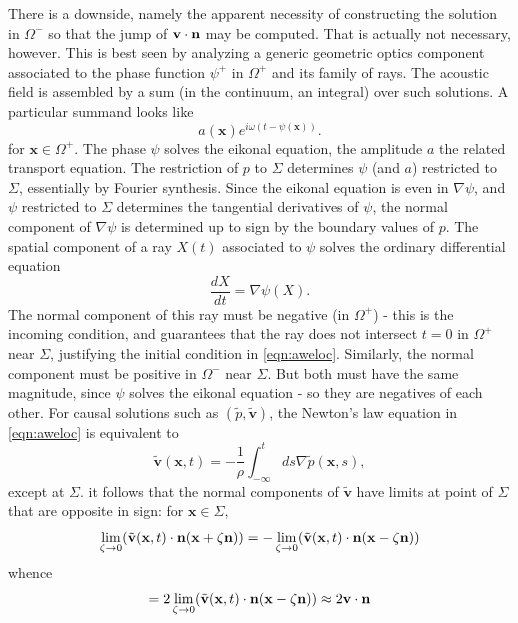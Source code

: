 \documentclass[georeport,12pt]{geophysics}
\newcommand{\bx}{\mathbf{x}}
\newcommand{\bv}{\mathbf{v}}
\begin{document}
There is a downside, namely the apparent necessity of constructing the
solution in $\Omega^-$ so that the jump of $\bv \cdot {\bf n}$ may be
computed. That is actually not necessary, however.
This is best seen by analyzing a generic geometric optics
component associated to the phase function $\psi^+$ in $\Omega^+$ and its family of
rays. The acoustic field is assembled by a sum (in the continuum, an
integral) over such solutions. A particular summand looks like
\begin{equation}
  \label{eqn:go}
   a(\bx)e^{i\omega (t - \psi(\bx))}.
\end{equation}
for $\bx \in \Omega^+$.
The phase $\psi$ solves the eikonal equation, the amplitude $a$ the
related transport equation. The restriction of $p$
to $\Sigma$ determines $\psi$ (and $a$) restricted to $\Sigma$, essentially by
Fourier synthesis. Since the eikonal
equation is even in $\nabla \psi$,  and $\psi$ restricted to $\Sigma$
determines the tangential derivatives of $\psi$, the normal component
of $\nabla \psi$ is determined up to sign by the boundary values of
$p$. The spatial component of a ray $X(t)$ associated to $\psi$ solves
the ordinary differential equation
\begin{equation}
  \label{eqn:ray}
  \frac{dX}{dt} = \nabla \psi(X).
\end{equation}
The normal component of this ray must be negative (in
$\Omega^+$) - this is the incoming condition, and guarantees that the
ray does not intersect $t=0$ in $\Omega^+$ near $\Sigma$, justifying the initial
condition in \ref{eqn:aweloc}. Similarly, the normal component must be
positive in $\Omega^-$ near $\Sigma$. But both must have the same magnitude, since
$\psi$ solves the eikonal equation - so they are negatives of each
other. For causal solutions such as $(\tilde{p},\tilde{\bv})$, the
Newton's law equation in \ref{eqn:aweloc} is equivalent to
\begin{equation}\label{eqn:newt}
  \tilde{\bv}(\bx,t) = -\frac{1}{\rho}\int_{-\infty}^t ds \nabla \tilde{p}(\bx,s),
\end{equation}
except at $\Sigma$.
it follows that the normal components of $\tilde{\bv}$ have limits at
point of $\Sigma$ 
that are opposite in sign: for $\bx \in \Sigma$,
\[
  \lim_{\zeta \rightarrow 0} (\tilde{\bv}(\bx,t) \cdot {\bf
    n}(\bx+\zeta {\bf n})) = 
-\lim_{\zeta \rightarrow 0} (\tilde{\bv}(\bx,t) \cdot {\bf
  n}(\bx -\zeta {\bf n}))
\]
whence
\begin{equation}
[\tilde{\bv} \cdot {\bf n}] = 2  \label{eqn:vjump} \lim_{\zeta
  \rightarrow 0} (\tilde{\bv}(\bx,t) \cdot {\bf n}(\bx -\zeta {\bf
  n}))
\approx 2 \bv \cdot {\bf n}
\end{equation}
\end{document}
